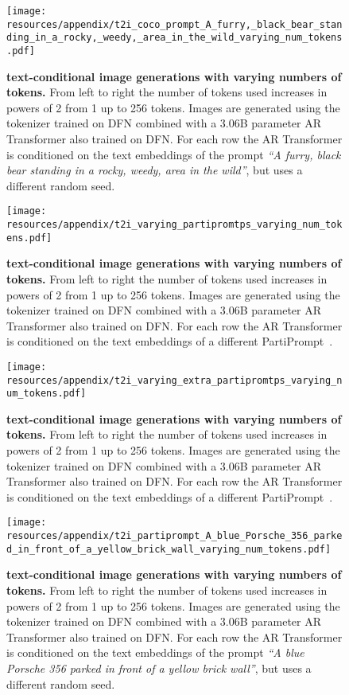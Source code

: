 \begin{figure}[ht!]
\centering
\texttt{[image: resources/appendix/t2i\_coco\_prompt\_A\_furry,\_black\_bear\_standing\_in\_a\_rocky,\_weedy,\_area\_in\_the\_wild\_varying\_num\_tokens.pdf]}
\caption{
\textbf{\ours text-conditional image generations with varying numbers of tokens.} From left to right the number of tokens used increases in powers of 2 from 1 up to 256 tokens. Images are generated using the \oursxlarge tokenizer trained on DFN combined with a 3.06B parameter AR Transformer also trained on DFN. For each row the AR Transformer is conditioned on the text embeddings of the prompt \textit{``A furry, black bear standing in a rocky, weedy, area in the wild''}, but uses a different random seed.
}
\label{fig:t2i_coco_prompt_A_furry_black_bear_varying_num_tokens}
\end{figure}

\begin{figure}[ht!]
\centering
\texttt{[image: resources/appendix/t2i\_varying\_partipromtps\_varying\_num\_tokens.pdf]}
\caption{
\textbf{\ours text-conditional image generations with varying numbers of tokens.} From left to right the number of tokens used increases in powers of 2 from 1 up to 256 tokens. Images are generated using the \oursxlarge tokenizer trained on DFN combined with a 3.06B parameter AR Transformer also trained on DFN. For each row the AR Transformer is conditioned on the text embeddings of a different PartiPrompt~\cite{Yu2022Parti}.
}
\label{fig:t2i_varying_partipromtps_varying_num_tokens}
\end{figure}

\begin{figure}[ht!]
\centering
\texttt{[image: resources/appendix/t2i\_varying\_extra\_partipromtps\_varying\_num\_tokens.pdf]}
\caption{
\textbf{\ours text-conditional image generations with varying numbers of tokens.} From left to right the number of tokens used increases in powers of 2 from 1 up to 256 tokens. Images are generated using the \oursxlarge tokenizer trained on DFN combined with a 3.06B parameter AR Transformer also trained on DFN. For each row the AR Transformer is conditioned on the text embeddings of a different PartiPrompt~\cite{Yu2022Parti}.
}
\label{fig:t2i_varying_extra_partipromtps_varying_num_tokens}
\end{figure}


\begin{figure}[ht!]
\centering
\texttt{[image: resources/appendix/t2i\_partiprompt\_A\_blue\_Porsche\_356\_parked\_in\_front\_of\_a\_yellow\_brick\_wall\_varying\_num\_tokens.pdf]}
\caption{
\textbf{\ours text-conditional image generations with varying numbers of tokens.} From left to right the number of tokens used increases in powers of 2 from 1 up to 256 tokens. Images are generated using the \oursxlarge tokenizer trained on DFN combined with a 3.06B parameter AR Transformer also trained on DFN. For each row the AR Transformer is conditioned on the text embeddings of the prompt \textit{``A blue Porsche 356 parked in front of a yellow brick wall''}, but uses a different random seed.
}
\label{fig:t2i_partiprompt_A_blue_Porsche_356_parked_in_front_of_a_yellow_brick_wall_varying_num_tokens}
\end{figure}
